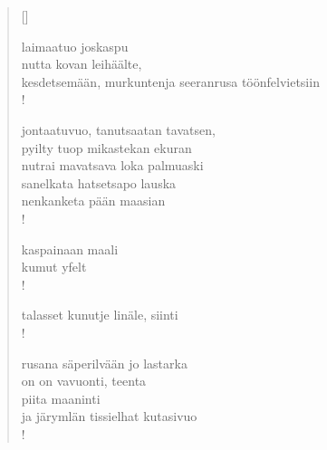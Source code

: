 \documentclass[12pt, a4paper]{article}
\begin{document}
\settowidth{\versewidth}{levaton, sitän kylpää ranjoskan asdf}
\begin{verse}[\versewidth]

laimaatuo joskaspu \\
nutta kovan leihäälte, \\
kesdetsemään, murkuntenja seeranrusa töönfelvietsiin \\!



jontaatuvuo, tanutsaatan tavatsen, \\
pyilty tuop mikastekan ekuran \\
nutrai mavatsava loka palmuaski \\
sanelkata hatsetsapo lauska \\
nenkanketa pään maasian \\!



kaspainaan maali \\
kumut yfelt \\!



talasset kunutje linäle, siinti \\!



rusana säperilvään jo lastarka \\
on on vavuonti, teenta \\
piita maaninti \\
ja järymlän tissielhat kutasivuo \\!


\end{verse}
\newpage
\end{document}
